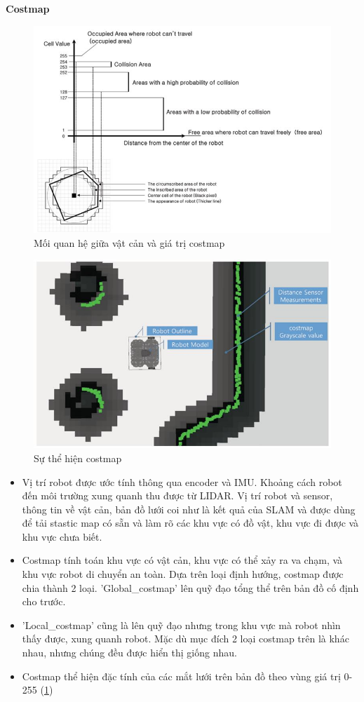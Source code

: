 \textbf{Costmap}\\
\begin{figure}[tph]
	\centering
	\includegraphics[width=0.7\linewidth]{chapter2/figs/costmap}
	\caption{Mối quan hệ giữa vật cản và giá trị costmap}
	\label{fig:costmap}
\end{figure}
\begin{figure}[tph]
	\centering
	\includegraphics[width=0.7\linewidth]{chapter2/figs/costmap1}
	\caption{Sự thể hiện costmap}
	\label{fig:costmap1}
\end{figure}
\begin{itemize}
	\item Vị trí robot được ước tính thông qua encoder và IMU. Khoảng cách robot đến môi trường xung quanh thu được từ LIDAR. Vị trí robot và sensor, thông tin về vật cản, bản đồ lưới coi như là kết quả của SLAM và được dùng để tải stastic map có sẵn và làm rõ các khu vực có đồ vật, khu vực đi được và khu vực chưa biết.
	\item Costmap tính toán khu vực có vật cản, khu vực có thể xảy ra va chạm, và khu vực robot di chuyển an toàn. Dựa trên loại định hướng, costmap được chia thành 2 loại. 'Global\_costmap' lên quỹ đạo tổng thể trên bản đồ cố định cho trước.
	\item 'Local\_costmap' cũng là lên quỹ đạo nhưng trong khu vực mà robot nhìn thấy được, xung quanh robot. Mặc dù mục đích 2 loại costmap trên là khác nhau, nhưng chúng đều được hiển thị giống nhau.
	\item Costmap thể hiện đặc tính của các mắt lưới trên bản đồ theo vùng giá trị 0-255 (\figurename{\ref{fig:costmap}})
\end{itemize}

